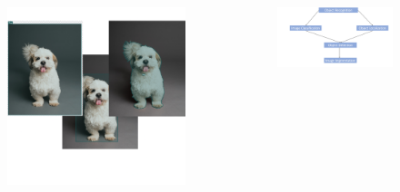 \begin{frame}[plain]
    \begin{columns}
            \begin{figure}
                \centering
                \includegraphics[width=1.1\textwidth,height=0.9\textheight,keepaspectratio]{images/object-detect/cover-1.png}
            \end{figure}
            \begin{figure}
                \centering
                \includegraphics[width=1\textwidth,height=0.9\textheight,keepaspectratio]{images/object-detect/cover-2.png}
            \end{figure}
    \end{columns}
\end{frame}